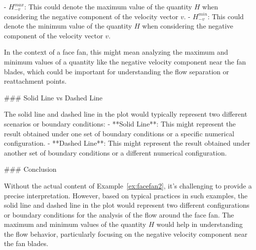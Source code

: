 - \( H_{-v}^{max} \): This could denote the maximum value of the quantity \( H \) when considering the negative component of the velocity vector \( v \).
- \( H_{-v}^{min} \): This could denote the minimum value of the quantity \( H \) when considering the negative component of the velocity vector \( v \).

In the context of a face fan, this might mean analyzing the maximum and minimum values of a quantity like the negative velocity component near the fan blades, which could be important for understanding the flow separation or reattachment points.

### Solid Line vs Dashed Line

The solid line and dashed line in the plot would typically represent two different scenarios or boundary conditions:
- **Solid Line**: This might represent the result obtained under one set of boundary conditions or a specific numerical configuration.
- **Dashed Line**: This might represent the result obtained under another set of boundary conditions or a different numerical configuration.

### Conclusion

Without the actual content of Example~\ref{ex:facefan2}, it's challenging to provide a precise interpretation. However, based on typical practices in such examples, the solid line and dashed line in the plot would represent two different configurations or boundary conditions for the analysis of the flow around the face fan. The maximum and minimum values of the quantity \( H \) would help in understanding the flow behavior, particularly focusing on the negative velocity component near the fan blades.